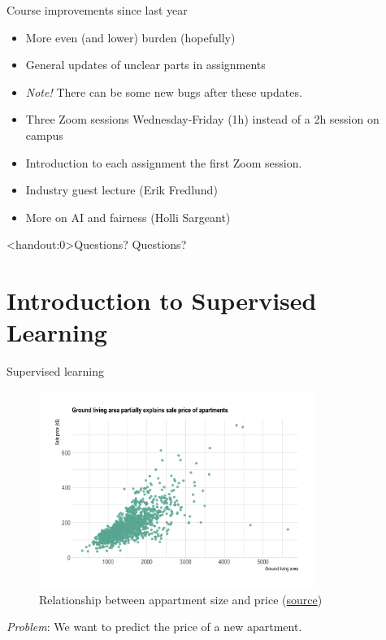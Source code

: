 \documentclass[10pt,handout]{beamer}
\begin{document}
\begin{frame}{Course improvements since last year}

\begin{itemize}
\item More even (and lower) burden (hopefully)
\item General updates of unclear parts in assignments
\item \emph{Note!} There can be some new bugs after these updates.
\item Three Zoom sessions Wednesday-Friday (1h) instead of a 2h session on campus
\item Introduction to each assignment the first Zoom session.
\item Industry guest lecture (Erik Fredlund)
\item More on AI and fairness (Holli Sargeant)
\end{itemize}

\end{frame}

\begin{frame}<handout:0>{Questions?}
Questions?
\end{frame}


\section{Introduction to Supervised Learning}
\frame{\sectionpage}

\begin{frame}{Supervised learning}

\begin{figure}[h]
\caption{Relationship between appartment size and price (\href{https://www.data-to-viz.com/story/TwoNum.html}{source})}
\centering
\includegraphics[width=0.8\textwidth]{figs/scatter_apartment.png}
\end{figure}

\emph{Problem}: We want to predict the price of a new apartment.

\end{frame}
\end{document}
